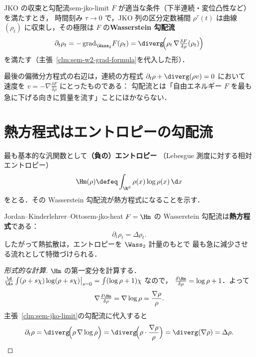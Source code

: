 \begin{claim}{JKO の収束と勾配流}{sem-jko-limit}
  $F$ が適当な条件（下半連続・変位凸性など）を満たすとき，
  時間刻み $\tau\to0$ で，JKO 列の区分定数補間
  $\rho^\tau(t)$ は曲線 $(\rho_t)$ に収束し，その極限は
  $F$ の\textbf{Wasserstein 勾配流}
  \[
    \partial_t\rho_t
    = -\,\mathrm{grad}_{\Wass_2}F(\rho_t)
    = \diverg\!\Bigl(\rho_t\,\nabla\tfrac{\delta F}{\delta\rho}(\rho_t)\Bigr)
  \]
  を満たす（主張~\ref{clm:sem-w2-grad-formula}を代入した形）．
\end{claim}

最後の偏微分方程式の右辺は，連続の方程式
$\partial_t\rho+\diverg(\rho v)=0$ において
速度を $v=-\nabla\tfrac{\delta F}{\delta\rho}$ にとったものである：
勾配流とは「自由エネルギー $F$ を最も急に下げる向きに質量を流す」ことにほかならない．

\section{熱方程式はエントロピーの勾配流}
\label{sec:sem-heat-as-gradient-flow}

最も基本的な汎関数として\textbf{（負の）エントロピー}
（Lebesgue 測度に対する相対エントロピー）
\[
  \Hm(\rho) \defeq \int_{\R^d} \rho(x)\log\rho(x)\,\d x
\]
をとる．その Wasserstein 勾配流が熱方程式になることを示す．

\begin{theorem}{Jordan--Kinderlehrer--Otto}{sem-jko-heat}
  $F=\Hm$ の Wasserstein 勾配流は\textbf{熱方程式}である：
  \[
    \partial_t\rho_t = \Delta\rho_t .
  \]
  したがって熱拡散は，エントロピーを $\Wass_2$ 計量のもとで
  最も急に減少させる流れとして特徴づけられる．
\end{theorem}

\begin{proof}[形式的な計算]
  $\Hm$ の第一変分を計算する．$\frac{\d}{\d s}\int(\rho+s\chi)\log(\rho+s\chi)
  \big|_{s=0}=\int(\log\rho+1)\chi$ なので，
  $\tfrac{\delta\Hm}{\delta\rho}=\log\rho+1$．よって
  \[
    \nabla\tfrac{\delta\Hm}{\delta\rho}
    = \nabla\log\rho = \frac{\nabla\rho}{\rho}.
  \]
  主張~\ref{clm:sem-jko-limit}の勾配流に代入すると
  \[
    \partial_t\rho
    = \diverg\!\Bigl(\rho\,\nabla\log\rho\Bigr)
    = \diverg\!\Bigl(\rho\cdot\frac{\nabla\rho}{\rho}\Bigr)
    = \diverg(\nabla\rho)
    = \Delta\rho.
  \]
\end{proof}

